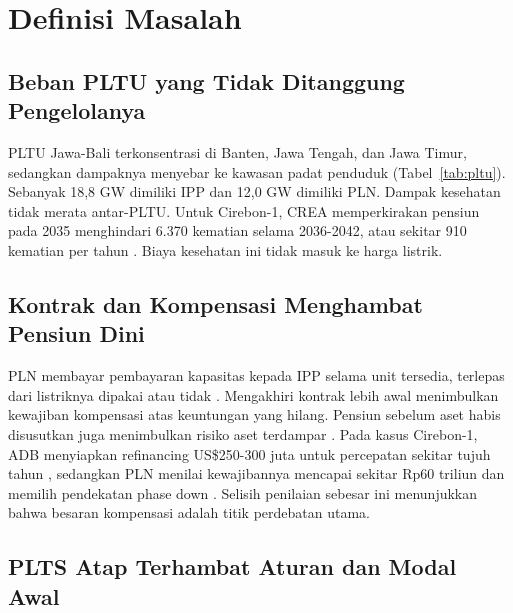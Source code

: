 \section{Definisi Masalah}
\label{sec:masalah}

\subsection{Beban PLTU yang Tidak Ditanggung Pengelolanya}

PLTU Jawa-Bali terkonsentrasi di Banten, Jawa Tengah, dan Jawa Timur, sedangkan dampaknya menyebar ke kawasan padat penduduk (Tabel~\ref{tab:pltu}). Sebanyak 18,8 GW dimiliki IPP dan 12,0 GW dimiliki PLN. Dampak kesehatan tidak merata antar-PLTU. Untuk Cirebon-1, CREA memperkirakan pensiun pada 2035 menghindari 6.370 kematian selama 2036-2042, atau sekitar 910 kematian per tahun \cite{B-ECOBUSINESS-CIREBON}. Biaya kesehatan ini tidak masuk ke harga listrik.

\begin{table}[H]
\centering
\caption{PLTU terhubung jaringan PLN Jawa-Bali per provinsi}
\label{tab:pltu}
\small

\end{table}

\subsection{Kontrak dan Kompensasi Menghambat Pensiun Dini}

PLN membayar pembayaran kapasitas kepada IPP selama unit tersedia, terlepas dari listriknya dipakai atau tidak \cite{P-IEEFA-2017}. Mengakhiri kontrak lebih awal menimbulkan kewajiban kompensasi atas keuntungan yang hilang. Pensiun sebelum aset habis disusutkan juga menimbulkan risiko aset terdampar \cite{P-KEFFORD-2018}. Pada kasus Cirebon-1, ADB menyiapkan refinancing US\$250-300 juta untuk percepatan sekitar tujuh tahun \cite{B-REUTERS-CIREBON-2022,B-ADB-CIREBON}, sedangkan PLN menilai kewajibannya mencapai sekitar Rp60 triliun dan memilih pendekatan phase down \cite{B-PETROMINDO-CIREBON-BATAL,B-MONGABAY-202601}. Selisih penilaian sebesar ini menunjukkan bahwa besaran kompensasi adalah titik perdebatan utama.

\subsection{PLTS Atap Terhambat Aturan dan Modal Awal}

